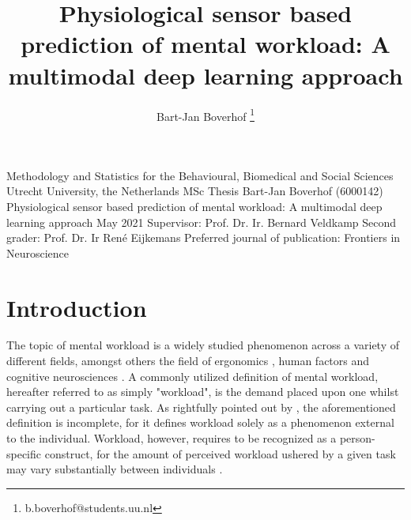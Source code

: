 \documentclass[fleqn,11pt]{paper}
\title{Physiological sensor based prediction of mental workload: A multimodal deep learning approach}
\author[1]{Bart-Jan Boverhof \thanks{b.boverhof@students.uu.nl}}
\affil[1]{\normalsize Faculty of Social and Behavioural Sciences, Utrecht University}
\begin{document}
\begin{titlepage}
\vspace{10mm}

\begin{large}
{\setlength{\parindent}{0cm}
Methodology and Statistics for the Behavioural, Biomedical and Social Sciences
}
\newline Utrecht University, the Netherlands
\vspace{18mm}
\newline MSc Thesis Bart-Jan Boverhof (6000142)
\newline Physiological sensor based prediction of mental workload: A multimodal deep learning approach
\newline May 2021
\vspace{18mm}
\newline Supervisor:
\newline Prof. Dr. Ir. Bernard Veldkamp
\vspace{10mm}
\newline Second grader:
\newline Prof. Dr. Ir René Eijkemans
\vspace{10mm}
\newline Preferred journal of publication: Frontiers in Neuroscience
\end{large}
\end{titlepage}

\flushbottom
\maketitle
%
%
\thispagestyle{empty}

\section{Introduction}
The topic of mental workload is a widely studied phenomenon across a variety of different fields, amongst others the field of ergonomics \cite{young2015state}, human factors \cite{pretorius2007development} and cognitive neurosciences \cite{shuggi2017mental}. A commonly utilized definition of mental workload, hereafter referred to as simply "workload", is the demand placed upon one whilst carrying out a particular task. As rightfully pointed out by , the aforementioned definition is incomplete, for it defines workload solely as a phenomenon external to the individual. Workload, however, requires to be recognized as a person-specific construct, for the amount of perceived workload ushered by a given task may vary substantially between individuals \cite{de1996measurement}. 
\end{document}
